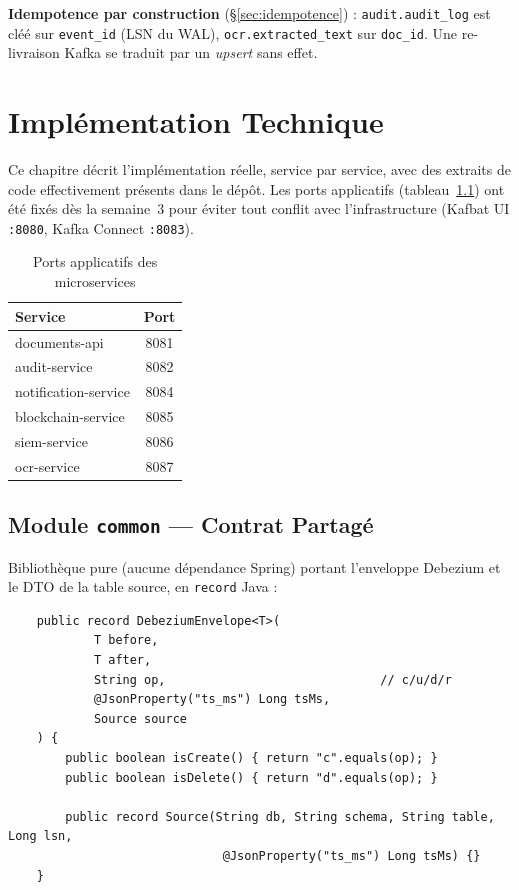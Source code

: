 \documentclass[12pt,a4paper,openany]{report}
\begin{document}
    \begin{notebox}
    \textbf{Idempotence par construction} (\S\ref{sec:idempotence}) : \texttt{audit.audit\_log} est cl\'e\'e sur \texttt{event\_id} (LSN du WAL), \texttt{ocr.extracted\_text} sur \texttt{doc\_id}. Une re-livraison Kafka se traduit par un \emph{upsert} sans effet.
    \end{notebox}

    \chapter{Impl\'ementation Technique}
    \label{chap:impl}

    Ce chapitre d\'ecrit l'impl\'ementation r\'eelle, service par service, avec des extraits de code effectivement pr\'esents dans le d\'ep\^ot. Les ports applicatifs (tableau~\ref{tab:ports}) ont \'et\'e fix\'es d\`es la semaine~3 pour \'eviter tout conflit avec l'infrastructure (Kafbat UI \texttt{:8080}, Kafka Connect \texttt{:8083}).

    \begin{table}[H]
    \centering
    \begin{tabularx}{\textwidth}{lc}
    \toprule
    \textbf{Service} & \textbf{Port} \\
    \midrule
    documents-api & 8081 \\
    audit-service & 8082 \\
    notification-service & 8084 \\
    blockchain-service & 8085 \\
    siem-service & 8086 \\
    ocr-service & 8087 \\
    \bottomrule
    \end{tabularx}
    \caption{Ports applicatifs des microservices}
    \label{tab:ports}
    \end{table}

    \section{Module \texttt{common} --- Contrat Partag\'e}

    Biblioth\`eque pure (aucune d\'ependance Spring) portant l'enveloppe Debezium et le DTO de la table source, en \texttt{record} Java :

    \begin{lstlisting}
    public record DebeziumEnvelope<T>(
            T before,
            T after,
            String op,                              // c/u/d/r
            @JsonProperty("ts_ms") Long tsMs,
            Source source
    ) {
        public boolean isCreate() { return "c".equals(op); }
        public boolean isDelete() { return "d".equals(op); }

        public record Source(String db, String schema, String table, Long lsn,
                              @JsonProperty("ts_ms") Long tsMs) {}
    }
    \end{lstlisting}
\end{document}
